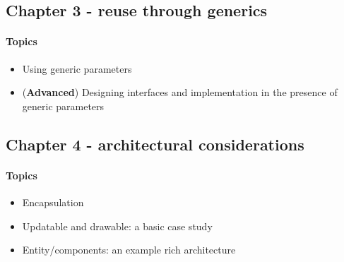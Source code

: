 \subsection{Chapter 3 - reuse through generics}
\paragraph*{Topics}			
\begin{itemize}
	\item Using generic parameters
	\item (\textbf{Advanced}) Designing interfaces and implementation in the presence of generic parameters
\end{itemize}


\subsection{Chapter 4 - architectural considerations}
\paragraph*{Topics}			
\begin{itemize}
	\item Encapsulation
	\item Updatable and drawable: a basic case study
	\item Entity/components: an example rich architecture
\end{itemize}
